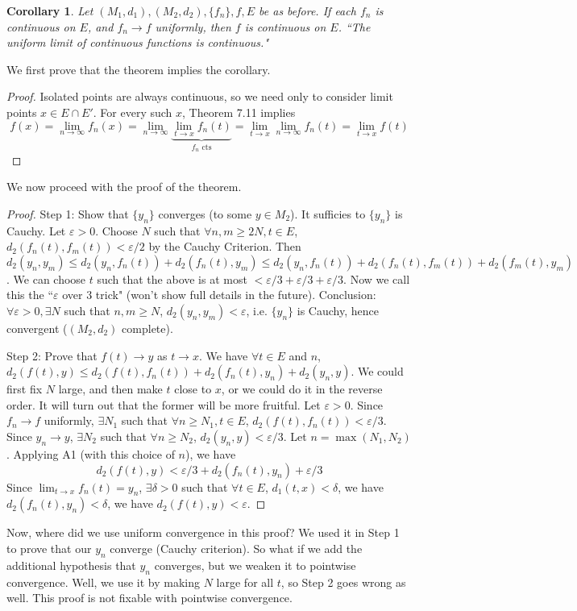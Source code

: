 \documentclass{article}
\theoremstyle{plain}
\newtheorem{corollary}{Corollary}
\theoremstyle{remark}
\newcommand{\ep}{{\varepsilon}}
\begin{document}
\begin{corollary}
	Let $(M_1,d_1),(M_2,d_2), \{f_n\}, f, E$ be as before.
	If each $f_n$ is continuous on $E$, and $f_n \to f$ uniformly,
	then $f$ is continuous on $E$.
	``The uniform limit of continuous functions is continuous."
\end{corollary}
We first prove that the theorem implies the corollary.
\begin{proof}
	Isolated points are always continuous,
	so we need only to consider limit points $x \in E \cap E'$.
	For every such $x$, Theorem 7.11 implies
	\[
		f(x) = \lim_{n\to\infty} f_n(x)
		= \lim_{n\to\infty}\underbrace{\lim_{t\to x}f_n(t)}_{f_n \text{ cts}}
		= \lim_{t\to x} \lim_{n \to \infty} f_n(t) = \lim_{t \to x}f(t)
	\]
\end{proof}

We now proceed with the proof of the theorem.
\begin{proof}
	Step 1: Show that $\{y_n\}$ converges (to some $y \in M_2$).
	It sufficies to $\{y_n\}$ is Cauchy.
	Let $\ep > 0$. Choose $N$ such that $\forall n,m \geq2 N, t \in E$,
	$d_2(f_n(t), f_m(t)) < \ep/2$ by the Cauchy Criterion.
	Then $d_2(y_n,y_m) \leq d_2(y_n,f_n(t)) + d_2(f_n(t), y_m)
	\leq d_2(y_n,f_n(t)) + d_2(f_n(t),f_m(t)) + d_2(f_m(t),y_m)$.
	We can choose $t$ such that the above is at most $< \ep/3 + \ep/3 + \ep/3$.
	Now we call this the ``$\ep$ over $3$ trick" (won't show full details in the future).
	Conclusion: $\forall \ep > 0, \exists N$ such that $n,m \geq N$,
	$d_2(y_n,y_m) < \ep$, i.e. $\{y_n\}$ is Cauchy, hence convergent
	($(M_2,d_2)$ complete).

	Step 2: Prove that $f(t) \to y$ as $t \to x$.
	We have $\forall t \in E$ and $n$, $d_2(f(t),y) \leq
	d_2(f(t),f_n(t)) + d_2(f_n(t),y_n) + d_2(y_n,y)$.
	We could first fix $N$ large, and then make $t$ close to $x$,
	or we could do it in the reverse order.
	It will turn out that the former will be more fruitful.
	Let $\ep > 0$. Since $f_n \to f$ uniformly, $\exists N_1$ such that
	$\forall n \geq N_1, t\in E$, $d_2(f(t),f_n(t)) < \ep/3$.
	Since $y_n \to y$, $\exists N_2$ such that $\forall n \geq N_2$,
	$d_2(y_n,y) < \ep/3$.
	Let $n = \max(N_1,N_2)$.
	Applying A1 (with this choice of $n$), we have
	\[
		d_2(f(t),y) < \ep/3 + d_2(f_n(t),y_n) + \ep/3
	\]
	Since $\lim_{t \to x} f_n(t) = y_n$,
	$\exists \delta > 0$ such that $\forall t \in E$, $d_1(t,x) < \delta$,
	we have $d_2(f_n(t),y_n) < \delta$,
	we have $d_2(f(t),y) < \ep$.
\end{proof}

Now, where did we use uniform convergence in this proof?
We used it in Step 1 to prove that our $y_n$ converge (Cauchy criterion).
So what if we add the additional hypothesis that $y_n$ converges,
but we weaken it to pointwise convergence.
Well, we use it by making $N$ large for all $t$,
so Step 2 goes wrong as well.
This proof is not fixable with pointwise convergence.
\end{document}
